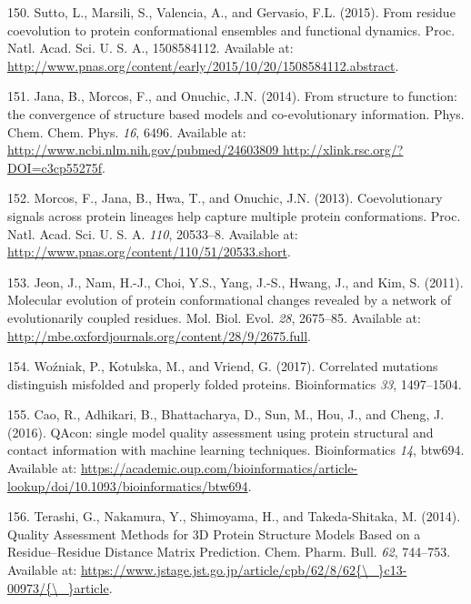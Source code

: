\documentclass[11pt,a4paper,twoside]{book}
\theoremstyle{definition}
\theoremstyle{definition}
\theoremstyle{remark}
\begin{document}
\hypertarget{ref-Sutto2015}{}
150. Sutto, L., Marsili, S., Valencia, A., and Gervasio, F.L. (2015).
From residue coevolution to protein conformational ensembles and
functional dynamics. Proc. Natl. Acad. Sci. U. S. A., 1508584112.
Available at:
\url{http://www.pnas.org/content/early/2015/10/20/1508584112.abstract}.

\hypertarget{ref-Jana2014}{}
151. Jana, B., Morcos, F., and Onuchic, J.N. (2014). From structure to
function: the convergence of structure based models and co-evolutionary
information. Phys. Chem. Chem. Phys. \emph{16}, 6496. Available at:
\href{http://www.ncbi.nlm.nih.gov/pubmed/24603809\%20http://xlink.rsc.org/?DOI=c3cp55275f}{http://www.ncbi.nlm.nih.gov/pubmed/24603809 http://xlink.rsc.org/?DOI=c3cp55275f}.

\hypertarget{ref-Morcos2013a}{}
152. Morcos, F., Jana, B., Hwa, T., and Onuchic, J.N. (2013).
Coevolutionary signals across protein lineages help capture multiple
protein conformations. Proc. Natl. Acad. Sci. U. S. A. \emph{110},
20533--8. Available at:
\url{http://www.pnas.org/content/110/51/20533.short}.

\hypertarget{ref-Jeon2011a}{}
153. Jeon, J., Nam, H.-J., Choi, Y.S., Yang, J.-S., Hwang, J., and Kim,
S. (2011). Molecular evolution of protein conformational changes
revealed by a network of evolutionarily coupled residues. Mol. Biol.
Evol. \emph{28}, 2675--85. Available at:
\url{http://mbe.oxfordjournals.org/content/28/9/2675.full}.

\hypertarget{ref-Wozniak2017}{}
154. Woźniak, P., Kotulska, M., and Vriend, G. (2017). Correlated
mutations distinguish misfolded and properly folded proteins.
Bioinformatics \emph{33}, 1497--1504.

\hypertarget{ref-Cao2016}{}
155. Cao, R., Adhikari, B., Bhattacharya, D., Sun, M., Hou, J., and
Cheng, J. (2016). QAcon: single model quality assessment using protein
structural and contact information with machine learning techniques.
Bioinformatics \emph{14}, btw694. Available at:
\url{https://academic.oup.com/bioinformatics/article-lookup/doi/10.1093/bioinformatics/btw694}.

\hypertarget{ref-Terashi2014a}{}
156. Terashi, G., Nakamura, Y., Shimoyama, H., and Takeda-Shitaka, M.
(2014). Quality Assessment Methods for 3D Protein Structure Models Based
on a Residue--Residue Distance Matrix Prediction. Chem. Pharm. Bull.
\emph{62}, 744--753. Available at:
\href{https://www.jstage.jst.go.jp/article/cpb/62/8/62\%7B/_\%7Dc13-00973/\%7B/_\%7Darticle}{https://www.jstage.jst.go.jp/article/cpb/62/8/62\{\textbackslash{}\_\}c13-00973/\{\textbackslash{}\_\}article}.
\end{document}
